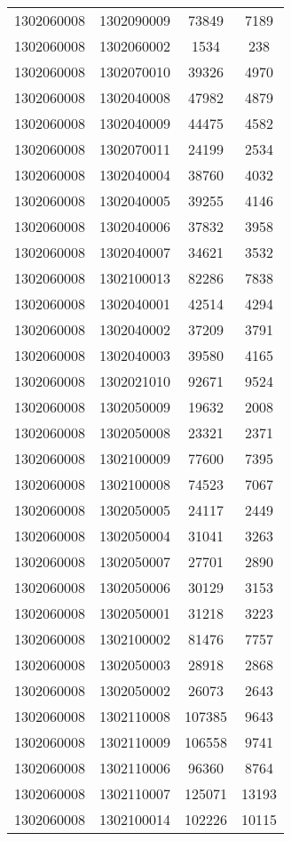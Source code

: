 \begin{longtable}[h]{llcc}
		1302060008 & 1302090009 & 73849 & 7189\\
		1302060008 & 1302060002 & 1534 & 238\\
		1302060008 & 1302070010 & 39326 & 4970\\
		1302060008 & 1302040008 & 47982 & 4879\\
		1302060008 & 1302040009 & 44475 & 4582\\
		1302060008 & 1302070011 & 24199 & 2534\\
		1302060008 & 1302040004 & 38760 & 4032\\
		1302060008 & 1302040005 & 39255 & 4146\\
		1302060008 & 1302040006 & 37832 & 3958\\
		1302060008 & 1302040007 & 34621 & 3532\\
		1302060008 & 1302100013 & 82286 & 7838\\
		1302060008 & 1302040001 & 42514 & 4294\\
		1302060008 & 1302040002 & 37209 & 3791\\
		1302060008 & 1302040003 & 39580 & 4165\\
		1302060008 & 1302021010 & 92671 & 9524\\
		1302060008 & 1302050009 & 19632 & 2008\\
		1302060008 & 1302050008 & 23321 & 2371\\
		1302060008 & 1302100009 & 77600 & 7395\\
		1302060008 & 1302100008 & 74523 & 7067\\
		1302060008 & 1302050005 & 24117 & 2449\\
		1302060008 & 1302050004 & 31041 & 3263\\
		1302060008 & 1302050007 & 27701 & 2890\\
		1302060008 & 1302050006 & 30129 & 3153\\
		1302060008 & 1302050001 & 31218 & 3223\\
		1302060008 & 1302100002 & 81476 & 7757\\
		1302060008 & 1302050003 & 28918 & 2868\\
		1302060008 & 1302050002 & 26073 & 2643\\
		1302060008 & 1302110008 & 107385 & 9643\\
		1302060008 & 1302110009 & 106558 & 9741\\
		1302060008 & 1302110006 & 96360 & 8764\\
		1302060008 & 1302110007 & 125071 & 13193\\
		1302060008 & 1302100014 & 102226 & 10115\\

\end{longtable}
